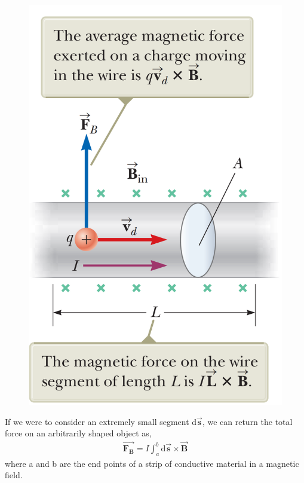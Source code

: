 \documentclass[12pt, titlepage, oneside]{article}
\let\oldvec\vec
\renewcommand{\vec}[1]{\oldvec{\bm{#1}}}
\begin{document}
\begin{figure}
\begin{center}
	\vspace{-1.5cm}
	\includegraphics[scale=.3]{4.png}
\end{center}
\end{figure}
If we were to consider an extremely small segment d$\vec{s}$, we can return the total force on an arbitrarily shaped object as,
\begin{align*}
\vec{F_B} = I \int_a^b \text{d}\vec{s} \times \vec{B}
\end{align*}
where a and b are the end points of a strip of conductive material in a magnetic field.
\end{document}
